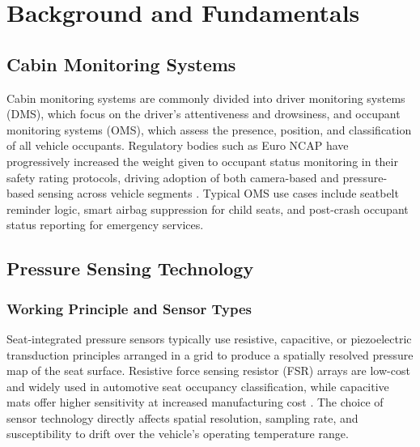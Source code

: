 \chapter{Background and Fundamentals}
\label{ch:background}

\section{Cabin Monitoring Systems}
\label{sec:cabin-monitoring-systems}
Cabin monitoring systems are commonly divided into driver monitoring
systems (DMS), which focus on the driver's attentiveness and drowsiness,
and occupant monitoring systems (OMS), which assess the presence,
position, and classification of all vehicle occupants. Regulatory bodies
such as Euro NCAP have progressively increased the weight given to
occupant status monitoring in their safety rating protocols, driving
adoption of both camera-based and pressure-based sensing across vehicle
segments \cite{euroncap2023protocol}. Typical OMS use cases include
seatbelt reminder logic, smart airbag suppression for child seats, and
post-crash occupant status reporting for emergency services.


\section{Pressure Sensing Technology}
\label{sec:pressure-sensing}

\subsection{Working Principle and Sensor Types}
\label{sec:pressure-working-principle}
Seat-integrated pressure sensors typically use resistive, capacitive, or
piezoelectric transduction principles arranged in a grid to produce a
spatially resolved pressure map of the seat surface. Resistive force
sensing resistor (FSR) arrays are low-cost and widely used in automotive
seat occupancy classification, while capacitive mats offer higher
sensitivity at increased manufacturing cost \cite{mueller2019pressure}.
The choice of sensor technology directly affects spatial resolution,
sampling rate, and susceptibility to drift over the vehicle's operating
temperature range.


